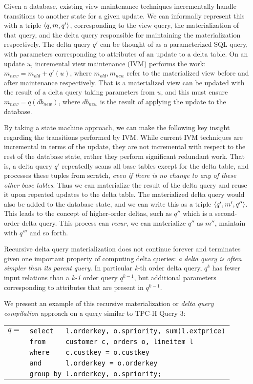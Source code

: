 Given a database, existing view maintenance techniques incrementally handle
transitions to another state for a given update. We can informally represent
this with a triple ${\langle q,m,q'\rangle}$, corresponding to the view query, the
materialization of that query, and the delta query responsible for maintaining
the materialization respectively. The delta query $q'$ can be thought of as a
parameterized SQL query, with parameters corresponding to attributes of an
update to a delta table. On an update $u$, incremental view maintenance (IVM)
performs the work: $m_{new} = m_{old} + q'(u)$, where $m_{old}, m_{new}$ refer
to the materialized view before and after maintenance respectively. That is a
materialized view can be updated with the result of a delta query taking
parameters from $u$, and this must ensure $m_{new} = q(db_{new})$, where
$db_{new}$ is the result of applying the update to the database.

By taking a state machine approach, we can make the following key insight
regarding the transitions performed by IVM. While current IVM techniques are
incremental in terms of the update, they are not incremental with respect to the
rest of the database state, rather they perform significant redundant work. That
is, a delta query $q'$ repeatedly scans all base tables except for the delta
table, and processes these tuples from scratch, \textit{even if there is no
change to any of these other base tables}. Thus we can materialize the result of
the delta query and reuse it upon repeated updates to the delta table. The
materialized delta query would also be added to the database state, and we can
write this as a triple ${\langle q',m',q''\rangle}$. This leads to the concept of
higher-order deltas, such as $q''$ which is a second-order delta query. This
process can \textit{recur}, we can materialize $q''$ as $m''$, maintain with
$q'''$ and so forth.

Recursive delta query materialization does not continue forever and terminates
given one important property of computing delta queries: \textit{a delta query
is often simpler than its parent query}. In particular \textit{k}-th order delta
query, $q^k$ has fewer input relations than a \textit{k-1} order query
$q^{k-1}$, but additional parameters corresponding to attributes that are
present in $q^{k-1}$.

We present an example of this recursive materialization or \textit{delta query
compilation} approach on a query similar to TPC-H Query 3:

\def \ql#1{{\tt #1}}
\hspace{-6mm}
\begin{tabular}{ll}
$q =$ & \ql{select\ \ \ l.orderkey, o.spriority, sum(l.extprice)}\\
      & \ql{from\ \ \ \ \ customer c, orders o, lineitem l}\\
      & \ql{where\ \ \ \ c.custkey = o.custkey}\\
      & \ql{and\ \ \ \ \ \ l.orderkey = o.orderkey}\\
      & \ql{group by l.orderkey, o.spriority;}
\end{tabular}


